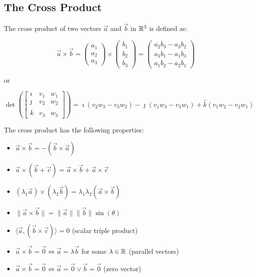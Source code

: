 \subsection{The Cross Product}

The cross product of two vectors \(\vec{a}\) and \(\vec{b}\) in \(\mathbb{R}^3\) is defined as:

\[
	\vec{a} \times \vec{b} = \begin{pmatrix} a_1 \\ a_2 \\ a_3 \end{pmatrix} \times \begin{pmatrix} b_1 \\ b_2 \\ b_3 \end{pmatrix} = \begin{pmatrix} a_2 b_3 - a_3 b_2 \\ a_3 b_1 - a_1 b_3 \\ a_1 b_2 - a_2 b_1 \end{pmatrix}
\]

or 

\[
	\det\left( \begin{bmatrix}
		\imath & v_1 & w_1 \\
		\jmath & v_2 & w_2 \\
		\hat{k} & v_3 & w_3
	\end{bmatrix} \right)
	= \imath (v_2 w_3 - v_3 w_2) - \jmath (v_1 w_3 - v_3 w_1) + \hat{k}(v_1 w_2 - v_2 w_1)
\]


The cross product has the following properties:

\begin{itemize}
	\item \(\vec{a} \times \vec{b} = -(\vec{b} \times \vec{a})\)
	\item \(\vec{a} \times (\vec{b} + \vec{c}) = \vec{a} \times \vec{b} + \vec{a} \times \vec{c}\)
	\item \((\lambda_1\vec{a}) \times (\lambda_2\vec{b}) = \lambda_1\lambda_2(\vec{a} \times \vec{b})\)
	\item \(\|\vec{a} \times \vec{b}\| = \|\vec{a}\|\|\vec{b}\| \sin(\theta)\)
	\item \(\langle\vec{a}, (\vec{b} \times \vec{c})\rangle = 0\) (scalar triple product)
	\item \(\vec{a} \times \vec{b} = \vec{0} \Leftrightarrow \vec{a} = \lambda\vec{b}\) for some \(\lambda \in \mathbb{R}\) (parallel vectors)
	\item \(\vec{a} \times \vec{b} = \vec{0} \Leftrightarrow \vec{a} = \vec{0} \vee \vec{b} = \vec{0}\) (zero vector)
\end{itemize}

